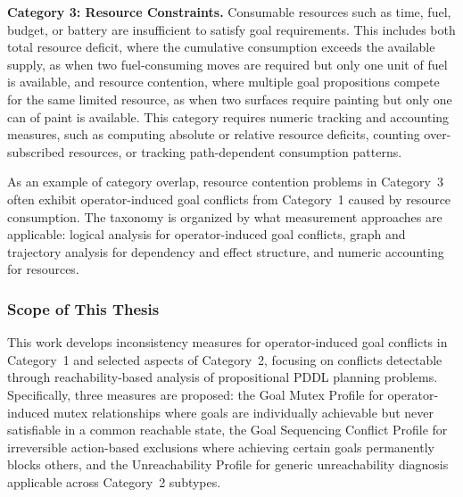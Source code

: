 \textbf{Category 3: Resource Constraints.} Consumable resources such as time, fuel, budget, or battery are insufficient to satisfy goal requirements. This includes both total resource deficit, where the cumulative consumption exceeds the available supply, as when two fuel-consuming moves are required but only one unit of fuel is available, and resource contention, where multiple goal propositions compete for the same limited resource, as when two surfaces require painting but only one can of paint is available. This category requires numeric tracking and accounting measures, such as computing absolute or relative resource deficits, counting over-subscribed resources, or tracking path-dependent consumption patterns.

As an example of category overlap, resource contention problems in Category~3 often exhibit operator-induced goal conflicts from Category~1 caused by resource consumption. The taxonomy is organized by what measurement approaches are applicable: logical analysis for operator-induced goal conflicts, graph and trajectory analysis for dependency and effect structure, and numeric accounting for resources.

\subsubsection{Scope of This Thesis}

This work develops inconsistency measures for operator-induced goal conflicts in Category~1 and selected aspects of Category~2, focusing on conflicts detectable \linebreak through reachability-based analysis of propositional \ac{PDDL} planning problems. Spe\-cifically, three measures are proposed: the Goal Mutex Profile for operator-induced mutex relationships where goals are individually achievable but never satisfiable in a common reachable state, the Goal Sequencing Conflict Profile for irreversible action-based exclusions where achieving certain goals permanently blocks others, and the Unreachability Profile for generic unreachability diagnosis applicable across Category~2 subtypes.

